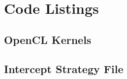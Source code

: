 \appendix

\section{Code Listings \label{sec:Code-Listings}}

\subsection{OpenCL Kernels\label{sub:OpenCL-Kernels}}

\subsection{Intercept Strategy File}

\cleardoublepage{}


